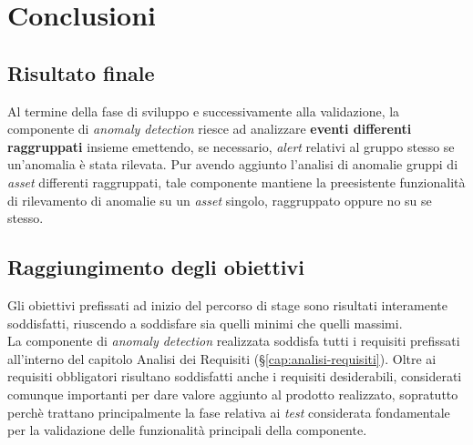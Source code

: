 
\chapter{Conclusioni}
\label{cap:conclusioni}


\section{Risultato finale}
Al termine della fase di sviluppo e successivamente alla validazione, la componente di \textit{anomaly detection} riesce ad analizzare \textbf{eventi differenti raggruppati} insieme emettendo, se necessario, \textit{alert} relativi al gruppo stesso se un'anomalia è stata rilevata. Pur avendo aggiunto l'analisi di anomalie gruppi di \textit{asset} differenti raggruppati, tale componente mantiene la preesistente funzionalità di rilevamento di anomalie su un \textit{asset} singolo, raggruppato oppure no su se stesso.\\

\section{Raggiungimento degli obiettivi}
Gli obiettivi prefissati ad inizio del percorso di stage sono risultati interamente soddisfatti, riuscendo a soddisfare sia quelli minimi che quelli massimi.\\
La componente di \textit{anomaly detection} realizzata soddisfa tutti i requisiti prefissati all'interno del capitolo Analisi dei Requisiti (\S\ref{cap:analisi-requisiti}). Oltre ai requisiti obbligatori risultano soddisfatti anche i requisiti desiderabili, considerati comunque importanti per dare valore aggiunto al prodotto realizzato, sopratutto perchè trattano principalmente la fase relativa ai \textit{test} considerata fondamentale per la validazione delle funzionalità principali della componente.

